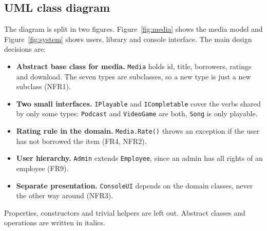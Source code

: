 \subsection{UML class diagram}

The diagram is split in two figures. Figure~\ref{fig:media} shows the media model and Figure~\ref{fig:system} shows users, library and console interface. The main design decisions are:

\begin{itemize}
  \item \textbf{Abstract base class for media.} \texttt{Media} holds id, title, borrowers, ratings and download. The seven types are subclasses, so a new type is just a new subclass (NFR1).
  \item \textbf{Two small interfaces.} \texttt{IPlayable} and \texttt{ICompletable} cover the verbs shared by only some types: \texttt{Podcast} and \texttt{VideoGame} are both, \texttt{Song} is only playable.
  \item \textbf{Rating rule in the domain.} \texttt{Media.Rate()} throws an exception if the user has not borrowed the item (FR4, NFR2).
  \item \textbf{User hierarchy.} \texttt{Admin} extends \texttt{Employee}, since an admin has all rights of an employee (FR9).
  \item \textbf{Separate presentation.} \texttt{ConsoleUI} depends on the domain classes, never the other way around (NFR3).
\end{itemize}

Properties, constructors and trivial helpers are left out. Abstract classes and operations are written in italics.

